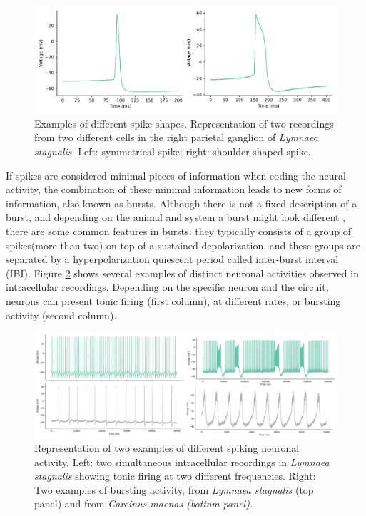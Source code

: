 \begin{figure}[htb!]
    \centering
    \includegraphics[width=\linewidth]{img/intro/spike-types.pdf}
    \caption{Examples of different spike shapes. Representation of two recordings from two different cells in the right parietal ganglion of \textit{Lymnaea stagnalis}. Left: symmetrical spike; right: shoulder shaped spike.}
    \label{fig:spike-types}
\end{figure}

If spikes are considered minimal pieces of information when coding the neural activity, the combination of these minimal information leads to new forms of information, also known as bursts. Although there is not a fixed description of a burst, and depending on the animal and system a burst might look different \parencite{russell_bursting_1978,palmu_detection_2010,lundqvist_gamma_2016}, there are some common features in bursts: they typically consists of a group of spikes(more than two) on top of a sustained depolarization, and these groups are separated by a hyperpolarization quiescent period called inter-burst interval (IBI). Figure \ref{fig:spike_activity-types} shows several examples of distinct neuronal activities observed in intracellular recordings. Depending on the specific neuron and the circuit, neurons can present tonic firing (first column), at different rates, or bursting activity (second column). 
\begin{figure}[htb!]
    \centering
    \includegraphics[width=\linewidth]{img/intro/spike_activity-types.pdf}
    \caption{Representation of two examples of different spiking neuronal activity. Left: two simultaneous intracellular recordings in \textit{Lymnaea stagnalis} showing tonic firing at two different frequencies. Right: Two examples of bursting activity, from \textit{Lymnaea stagnalis} (top panel) and from \textit{Carcinus maenas (bottom panel).}}
    \label{fig:spike_activity-types}
\end{figure}

